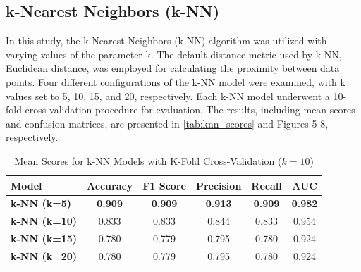 \subsection*{k-Nearest Neighbors (k-NN)}
In this study, the k-Nearest Neighbors (k-NN) algorithm was utilized with varying values of the parameter k. The default distance metric used by k-NN, Euclidean distance, was employed for calculating the proximity between data points. Four different configurations of the k-NN model were examined, with k values set to 5, 10, 15, and 20, respectively. Each k-NN model underwent a 10-fold cross-validation procedure for evaluation. The results, including mean scores and confusion matrices, are presented in \autoref{tab:knn_scores} and Figures 5-8, respectively.

\begin{table}[hhtbp]
    \centering
    \begin{tabular}{|l|c|c|c|c|c|}
    \hline
    \textbf{Model} & \textbf{Accuracy} & \textbf{F1 Score} & \textbf{Precision} & \textbf{Recall} & \textbf{AUC} \\ \hline
    \textbf{k-NN (k=5)} & \textbf{0.909} & \textbf{0.909} & \textbf{0.913} & \textbf{0.909} & \textbf{0.982} \\
    \textbf{k-NN (k=10)} & 0.833 & 0.833 & 0.844 & 0.833 & 0.954 \\
    \textbf{k-NN (k=15)} & 0.780 & 0.779 & 0.795 & 0.780 & 0.924 \\
    \textbf{k-NN (k=20)} & 0.780 & 0.779 & 0.795 & 0.780 & 0.924 \\ \hline
    \end{tabular}
    \caption{Mean Scores for k-NN Models with K-Fold Cross-Validation ($k=10$)}
    \label{tab:knn_scores}
\end{table}

